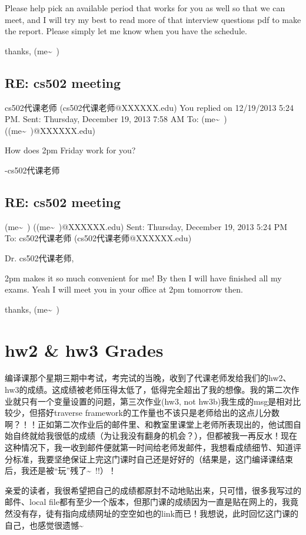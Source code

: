 \documentclass[12pt]{book}
\begin{document}
Please help pick an available period that works for you as well so that we can meet, and I will try my best to read more of that interview questions pdf to make the report. Please simply let me know when you have the schedule. 

thanks,
(me\textasciitilde{}~)


\section{RE: cs502 meeting}
\label{sec-33-5}
cs502代课老师 (cs502代课老师@XXXXXX.edu)
You replied on 12/19/2013 5:24 PM.
Sent:         Thursday, December 19, 2013 7:58 AM
To:        
 (me\textasciitilde{}~) ((me\textasciitilde{}~)@XXXXXX.edu)

How does 2pm Friday work for you?

-cs502代课老师


\section{RE: cs502 meeting}
\label{sec-33-6}
 (me\textasciitilde{}~) ((me\textasciitilde{}~)@XXXXXX.edu)
Sent:         Thursday, December 19, 2013 5:24 PM
To:        
cs502代课老师 (cs502代课老师@XXXXXX.edu)

Dr. cs502代课老师, 

2pm makes it so much convenient for me! By then I will have finished all my exams. Yeah I will meet you in your office at 2pm tomorrow then. 

thanks,
(me\textasciitilde{}~)

\chapter{hw2 \& hw3 Grades}
\label{sec-34}

编译课那个星期三期中考试，考完试的当晚，收到了代课老师发给我们的hw2、hw3的成绩。这成绩被老师压得太低了，低得完全超出了我的想像。我的第二次作业就只有一个变量设置的问题，第三次作业(hw3, not hw3b)我生成的msg是相对比较少，但搭好traverse framework的工作量也不该只是老师给出的这点儿分数啊？！！正如第二次作业后的邮件里、和教室里课堂上老师所表现出的，他试图自始自终就给我很低的成绩（为让我没有翻身的机会？），但都被我一再反水！现在这种情况下，我一收到邮件便就第一时间给老师发邮件，我想看成绩细节、知道评分标准，我要坚绝保证上完这门课时自己还是好好的（结果是，这门编译课结束后，我还是被“玩”残了\textasciitilde{}~!!）！

亲爱的读者，我很希望把自己的成绩都原封不动地贴出来，只可惜，很多我写过的邮件、local file都有至少一个版本，但那门课的成绩因为一直是贴在网上的，我竟然没有存，徒有指向成绩网址的空空如也的link而已！我想说，此时回忆这门课的自己，也感觉很遗憾\textasciitilde{}~
\end{document}
